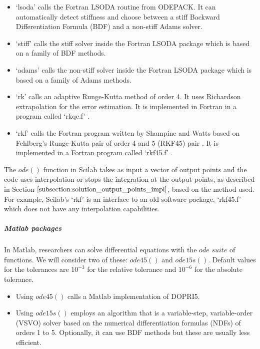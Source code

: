 \begin{itemize}
\item `lsoda' calls the Fortran LSODA routine from ODEPACK. It can automatically detect stiffness and choose between a stiff Backward Differentiation Formula (BDF) and a non-stiff Adams solver.

\item `stiff' calls the stiff solver inside the Fortran LSODA package which is based on a family of BDF methods.

\item `adams' calls the non-stiff solver inside the Fortran LSODA package which is based on a family of Adams methods.

\item `rk' calls an adaptive Runge-Kutta method of order 4. It uses Richardson extrapolation \cite{MR1261869} for the error estimation. It is implemented in Fortran in a program called `rkqc.f' \cite{scilabGithub}.

\item `rkf' calls the Fortran program written by Shampine and Watts based on Fehlberg's Runge-Kutta pair of order 4 and 5 (RKF45) pair \cite{osti7318812}. It is implemented in a Fortran program called `rkf45.f' \cite{scilabGithub}.
\end{itemize}

The $ode()$ function in Scilab takes as input a vector of output points and the code uses interpolation or stops the integration at the output points, as described in Section $\ref{subsection:solution_output_points_impl}$, based on the method used. For example, Scilab's `rkf' is an interface to an old software package, `rkf45.f' which does not have any interpolation capabilities.

\subparagraph{Matlab packages}
In Matlab, researchers can solve differential equations with the $ode$ $suite$ \cite{shampine1997matlab} of functions. We will consider two of these: $ode45()$ and $ode15s()$.
Default values for the tolerances are $10^{-3}$ for the relative tolerance and $10^{-6}$ for the absolute tolerance.

\begin{itemize}
\item Using $ode45()$ calls a Matlab implementation of DOPRI5.

\item Using $ode15s()$ employs an algorithm that is a variable-step, variable-order (VSVO) solver based on the numerical differentiation formulas (NDFs) \cite{shampine1997matlab} of orders 1 to 5. Optionally, it can use BDF methods but these are usually less efficient.
\end{itemize}

